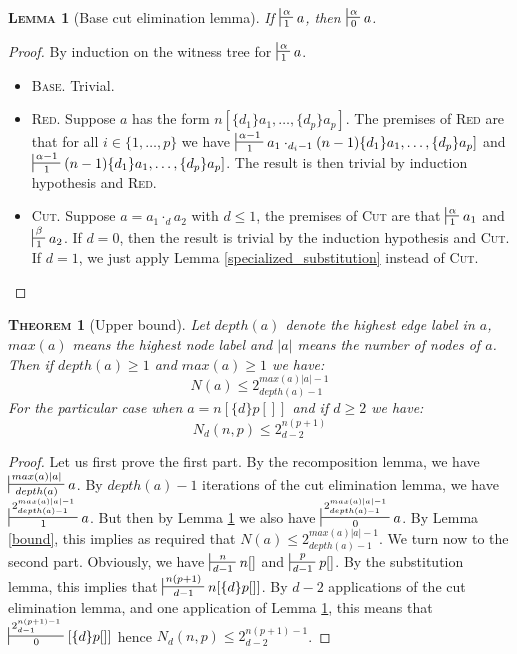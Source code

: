 \documentclass{article}
\newtheorem{lemma}{\textsc{Lemma}}
\newtheorem{theorem}{\textsc{Theorem}}
\begin{document}
\begin{lemma}[Base cut elimination lemma]
If $\sststile{1}{\alpha} a$, then $\sststile{0}{\alpha} a$.
\label{specialized_cut_elim}
\end{lemma}
\begin{proof}
By induction on the witness tree for $\sststile{1}{\alpha} a$.
\begin{itemize}
\item \textsc{Base.} Trivial.
\item \textsc{Red.} Suppose $a$ has the form $n[\{d_1\}a_1, \dots, \{d_p\}a_p]$. The premises of \textsc{Red} are that for all $i\in \{1, \dots, p\}$ we have
$\sststile{1}{\alpha-1} a_1 \cdot_{d_i - 1} (n-1)\{d_1\}a_1, \dots, \{d_p\}a_p]$ and $\sststile{1}{\alpha-1} (n-1)\{d_1\}a_1, \dots, \{d_p\}a_p]$. The result is then
trivial by induction hypothesis and \textsc{Red}.
\item \textsc{Cut.} Suppose $a = a_1 \cdot_d a_2$ with $d\leq 1$, the premises of \textsc{Cut} are that $\sststile{1}{\alpha} a_1$ and $\sststile{1}{\beta} a_2$. If $d=0$, then the result
is trivial by the induction hypothesis and \textsc{Cut}. If $d=1$, we just apply Lemma \ref{specialized_substitution} instead of \textsc{Cut}.
\end{itemize}
\end{proof}

\begin{theorem}[Upper bound]
Let $depth(a)$ denote the highest edge label in $a$, $max(a)$ means the highest node label and $|a|$ means the number of nodes of $a$. Then if $depth(a)\geq 1$ and $max(a) \geq 1$ we have:
\[
N(a) \leq 2_{depth(a)-1}^{max(a)|a|-1}
\]
For the particular case when $a=n[\{d\}p[]]$ and if $d\geq 2$ we have:
\[
N_d(n, p) \leq 2_{d-2}^{n(p+1)}
\]
\end{theorem}
\begin{proof}
Let us first prove the first part. By the recomposition lemma, we have $\sststile{depth(a)}{max(a)|a|} a$. By $depth(a)-1$ iterations of the cut elimination lemma, we have
$\sststile{1}{2_{depth(a)-1}^{max(a)|a|-1}} a$. But then by Lemma \ref{specialized_cut_elim} we also have $\sststile{0}{2_{depth(a)-1}^{max(a)|a|-1}} a$. By Lemma \ref{bound}, this
implies as required that $N(a) \leq 2_{depth(a)-1}^{max(a)|a|-1}$. We turn now to the second part. Obviously, we have $\sststile{d-1}{n} n[]$ and $\sststile{d-1}{p} p[]$. By the
substitution lemma, this implies that $\sststile{d-1}{n(p+1)} n[\{d\}p[]]$. By $d-2$ applications of the cut elimination lemma, and one application of Lemma \ref{specialized_cut_elim}, this means
that $\sststile{0}{2_{d-1}^{n(p+1)-1}} [\{d\}p[]]$ hence $N_d(n,p) \leq 2_{d-2}^{n(p+1)-1}$.
\end{proof}
\end{document}
